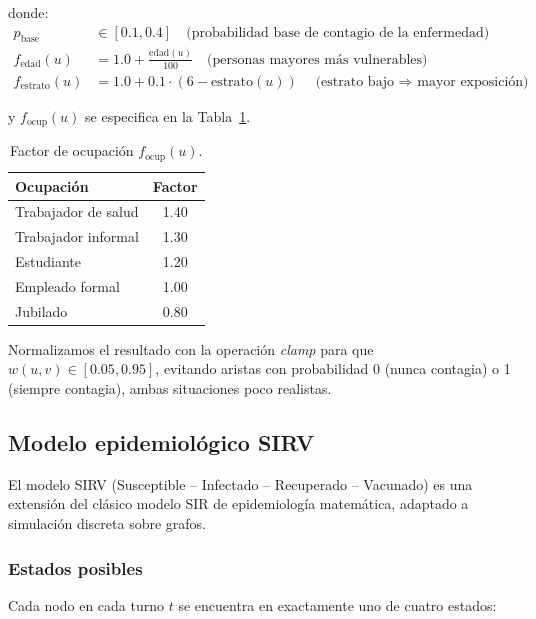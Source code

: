 \documentclass[spanish,notitlepage,letterpaper, 12pt]{article}
\begin{document}
donde:
\begin{align*}
p_{\text{base}} &\in [0.1, 0.4] \quad \text{(probabilidad base de contagio de la enfermedad)} \\
f_{\text{edad}}(u) &= 1.0 + \frac{\text{edad}(u)}{100} \quad \text{(personas mayores m\'as vulnerables)} \\
f_{\text{estrato}}(u) &= 1.0 + 0.1 \cdot (6 - \text{estrato}(u)) \quad \text{(estrato bajo $\Rightarrow$ mayor exposici\'on)}
\end{align*}

y $f_{\text{ocup}}(u)$ se especifica en la Tabla~\ref{tab:factor_ocupacion}.

\begin{table}[H]
\centering
\caption{Factor de ocupaci\'on $f_{\text{ocup}}(u)$.}
\label{tab:factor_ocupacion}
\begin{tabular}{lc}
\toprule
\textbf{Ocupaci\'on} & \textbf{Factor} \\
\midrule
Trabajador de salud & 1.40 \\
Trabajador informal & 1.30 \\
Estudiante & 1.20 \\
Empleado formal & 1.00 \\
Jubilado & 0.80 \\
\bottomrule
\end{tabular}
\end{table}

Normalizamos el resultado con la operaci\'on \textit{clamp} para que $w(u,v) \in [0.05, 0.95]$, evitando aristas con probabilidad 0 (nunca contagia) o 1 (siempre contagia), ambas situaciones poco realistas.

\subsection{Modelo epidemiol\'ogico SIRV}

El modelo SIRV (Susceptible -- Infectado -- Recuperado -- Vacunado) es una extensi\'on del cl\'asico modelo SIR de epidemiolog\'ia matem\'atica, adaptado a simulaci\'on discreta sobre grafos.

\subsubsection{Estados posibles}

Cada nodo en cada turno $t$ se encuentra en exactamente uno de cuatro estados:
\end{document}
